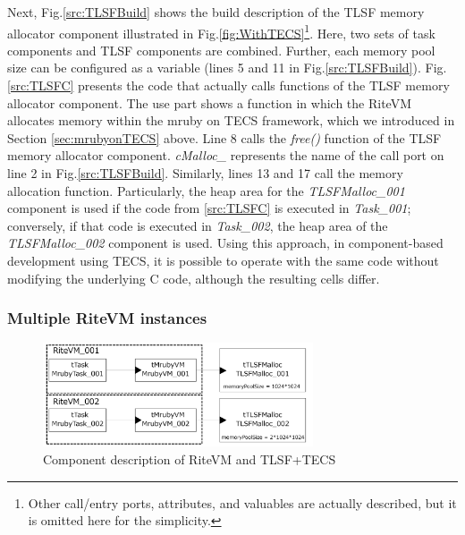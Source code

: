\documentclass[JIP]{ipsj_v2/UTF8/ipsj}
\begin{document}
Next, Fig.\ref{src:TLSFBuild} shows the build description of the TLSF memory allocator component illustrated in Fig.\ref{fig:WithTECS}\footnote{Other call/entry ports, attributes, and valuables are actually described, but it is omitted here for the simplicity.}.
Here, two sets of task components and TLSF components are combined.
Further, each memory pool size can be configured as a variable (lines 5 and 11 in Fig.\ref{src:TLSFBuild}).
Fig.\ref{src:TLSFC} presents the code that actually calls functions of the TLSF memory allocator component.
The use part shows a function in which the RiteVM allocates memory within the mruby on TECS framework\cite{par:mrubyonTECS}\cite{par:mrubyonTECS3}, which we introduced in Section \ref{sec:mrubyonTECS} above.
Line 8 calls the {\it free()} function of the TLSF memory allocator component.
{\it cMalloc\_} represents the name of the call port on line 2 in Fig.\ref{src:TLSFBuild}.
Similarly, lines 13 and 17 call the memory allocation function.
Particularly, the heap area for the {\it TLSFMalloc\_001} component is used if the code from \ref{src:TLSFC} is executed in {\it Task\_001}; conversely, if that code is executed in {\it Task\_002}, the heap area of the {\it TLSFMalloc\_002} component is used.
Using this approach, in component-based development using TECS, it is possible to operate with the same code without modifying the underlying C code, although the resulting cells differ.

\subsubsection*{Multiple RiteVM instances}

\begin{figure}[t]
    \centering
    \includegraphics[width=8cm,clip]{figure/UseCase_mruby.pdf}
    \caption{Component description of RiteVM and TLSF+TECS}
    \label{fig:UseCase_mruby}
\end{figure}
\end{document}
